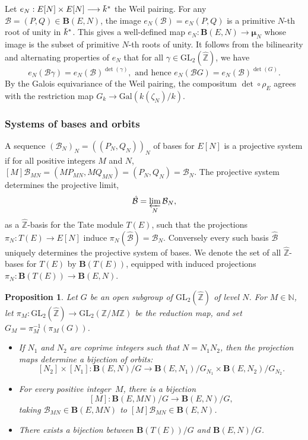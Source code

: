 \documentclass{amsart}
\newcommand{\cB}{\mathcal{B}}
\newcommand{\BB}{\mathbf{B}}
\newcommand{\NN}{\mathbb{N}}
\newcommand{\QQ}{\mathbb{Q}}
\newcommand{\ZZ}{\mathbb{Z}}
\newcommand{\ZZhat}{\widehat{\ZZ}}
\newcommand{\GL}{\mathrm{GL}}
\newcommand{\overbar}[1]{\mkern 2.0mu\overline{\mkern-2.0mu#1\mkern-2.0mu}\mkern 2.0mu}
\newcommand{\kbar}{\overbar{\smash{k}\vphantom{t}}}
\newcommand{\Gal}{\mathrm{Gal}}
\newcommand{\mmu}{\boldsymbol{\mu}}
\newtheorem{proposition}[theorem]{Proposition}
\begin{document}
Let $e_N: E[N] \times E[N] \longrightarrow \kbar^*$ the Weil pairing.  For any $\cB = (P,Q)
\in \BB(E,N)$, the image $e_N(\cB) = e_N(P,Q)$ is a primitive $N$-th root of unity in $\kbar^*$.
This gives a well-defined map $e_N: \BB(E,N) \longrightarrow \mmu_N$ whose image is the
subset of primitive $N$-th roots of unity.
It follows from the bilinearity and alternating properties of $e_N$ that for all $\gamma
\in \GL_2(\ZZhat)$, we have
$$
e_N(\cB\gamma) = e_N(\cB)^{\det(\gamma)}, \mbox{ and hence } e_N(\cB{G}) = e_N(\cB)^{\det(G)}.
$$
By the Galois equivariance of the Weil pairing, the compositum $\det \circ \rho_E$ agrees
with the restriction map $G_k \rightarrow \Gal(k(\zeta_N)/k)$.

\subsubsection*{Systems of bases and orbits}
A sequence $(\cB_N)_N = ((P_N,Q_N))_N$ of bases for $E[N]$ is a projective system
if for all positive integers $M$ and $N$, $[M]\cB_{MN} = (MP_{MN},MQ_{MN}) = (P_N,Q_N) = \cB_N$.
The projective system determines the projective limit,
$$
\hat{\cB} = \varprojlim_{N} \cB_N,
$$
as a $\ZZhat$-basis for the Tate module $T(E)$, such that the projections
$\pi_N: T(E) \rightarrow E[N]$ induce $\pi_N(\hat{\cB}) = \cB_N$.
Conversely every such basis $\hat{\cB}$ uniquely determines the projective system of bases.
We denote the set of all $\ZZhat$-bases for $T(E)$ by $\BB(T(E))$, equipped with
induced projections $\pi_N: \BB(T(E)) \rightarrow \BB(E,N)$.

\begin{proposition}
  Let $G$ be an open subgroup of $\GL_2(\ZZhat)$ of level $N$.
  For $M \in \NN$, let $\pi_M: \GL_2(\ZZhat) \rightarrow \GL_2(\ZZ/M\ZZ)$
  be the reduction map, and set $G_M = \pi_M^{-1}(\pi_M(G))$.

  \begin{itemize}
  \item
    If $N_1$ and $N_2$ are coprime integers such that $N = N_1N_2$, then
    the projection maps determine a bijection of orbits:
    $$
    [N_2] \times [N_1]:
    \BB(E,N)/G \longrightarrow
    \BB(E,N_1)/G_{N_1} \times \BB(E,N_2)/G_{N_2}.
    $$
  \item
    For every positive integer~$M$, there is a bijection
    $$
    [M]: \BB(E,MN)/G \longrightarrow \BB(E,N)/G,
    $$
    taking $\cB_{MN} \in \BB(E,MN)$ to $[M]\cB_{MN} \in \BB(E,N)$.
    \smallskip
  \item
    There exists a bijection between $\BB(T(E))/G$ and $\BB(E,N)/G$.
  \end{itemize}
\end{proposition}
\end{document}
